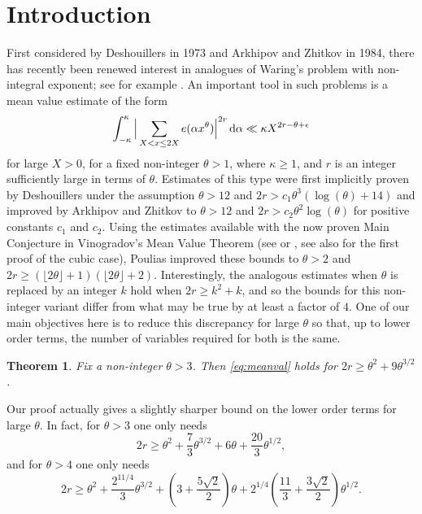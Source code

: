 \documentclass[11pt,reqno]{amsart}
\numberwithin{equation}{section}
\renewcommand{\d}{\,{\rm d}}
\newtheorem{theorem}{Theorem}[section]
\begin{document}
\section{Introduction}
First considered by Deshouillers \cite{Des} in 1973 and Arkhipov and Zhitkov \cite{ArkhZhit} in 1984, there has recently been renewed interest in analogues of Waring's problem with non-integral exponent; see for example \cite{Bhargava2, Kuf, mad26, Poulias1, Poulthesis, taf26}. An important tool in such problems is a mean value estimate of the form 
\begin{align} \label{eq:meanval}
\int_{-\kappa}^{\kappa} \Big| \sum_{X < x \leq 2X} e(\alpha x^{\theta}) \Big|^{2r} \d\alpha \ll \kappa X^{2r - \theta+\epsilon} 
\end{align}
for large $X > 0$, for a fixed non-integer $\theta > 1$, where $\kappa \geq 1$, and $r$ is an integer sufficiently large in terms of $\theta$. Estimates of this type were first implicitly proven by Deshouillers \cite{Des} under the assumption $\theta > 12$ and $2r > c_1\theta^3(\log(\theta)+14)$ and improved by Arkhipov and Zhitkov \cite{ArkhZhit} to $\theta > 12$ and $2r > c_2\theta^2\log(\theta) $ for positive constants $c_1$ and $c_2$. Using the estimates available with the now proven Main Conjecture in Vinogradov's Mean Value Theorem (see \cite{BDG} or \cite{WooNEC}, see also \cite{WooleyCube} for the first proof of the cubic case), Poulias \cite{Poulias1} improved these bounds to $\theta > 2$ and $2r \geq (\lfloor 2\theta \rfloor + 1)(\lfloor 2\theta \rfloor + 2)$. Interestingly, the analogous estimates when $\theta$ is replaced by an integer $k$ hold when $2r \geq k^2+k$, and so the bounds for this non-integer variant differ from what may be true by at least a factor of $4$. One of our main objectives here is to reduce this discrepancy for large $\theta$ so that, up to lower order terms, the number of variables required for both is the same. 

\begin{theorem} \label{thm:main}
Fix a non-integer $\theta > 3$. Then \eqref{eq:meanval} holds for $2r \geq \theta^2+9\theta^{3/2}$. 
\end{theorem}

Our proof actually gives a slightly sharper bound on the lower order terms for large $\theta$. In fact, for $\theta > 3$ one only needs 
\[2r \geq \theta^2 +\frac{7}{3}\theta^{3/2}+6\theta+\frac{20}{3}\theta^{1/2}, \] 
and for $\theta > 4$ one only needs 
\[ 2r \geq \theta^2+\frac{2^{11/4}}{3} \theta^{3/2}+(3+\frac{5\sqrt{2}}{2})\theta+2^{1/4}(\frac{11}{3}+\frac{3\sqrt{2}}{2})\theta^{1/2}. \]
\end{document}
